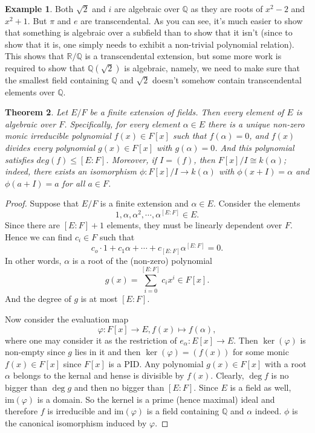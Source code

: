 \documentclass[12pt]{report}
\newtheorem{thm}{Theorem}[section]
\theoremstyle{definition}
\newtheorem{example}[thm]{Example}
\def\QQ{\mathbb{Q}}
\def\RR{\mathbb{R}}
\def\im{\mbox{im}}
\def\aa{\alpha}
\begin{document}
\begin{example}
    Both $\sqrt{2}$ and $i$ are algebraic over $\QQ$ as they are roots of $x^2-2$ and $x^2+1$.  But $\pi$ and $e$ are transcendental. As you can see, it's much easier to show that something is algebraic over a subfield than to show that it isn't (since to show that it is, one simply needs to exhibit a non-trivial
    polynomial relation). This shows that $\RR/\QQ$ is a transcendental extension, but some more work is required to show that $\QQ(\sqrt{2})$ is algebraic, namely, we need to make sure that the smallest
    field containing $\QQ$ and $\sqrt{2}$ doesn't somehow contain transcendental elements over $\QQ$.
\end{example}


\begin{thm}\label{minimal}
    Let $E/F$ be a finite extension of fields. Then every element of $E$ is algebraic over $F$. Specifically, for every element $\aa\in E$ there is a unique non-zero monic irreducible polynomial $f(x) \in F[x]$ such that $f(\aa) = 0$, and $f(x)$ divides every polynomial $g(x) \in F[x]$ with $g(\aa) = 0$. And this polynomial satisfies $deg(f) \leq [E:F]$. Moreover, if $I=(f)$, then $F[x]/I \cong k(\aa)$; indeed, there exists an isomorphism $\phi: F[x]/I \to k(\aa)$ with $\phi(x+I)=\alpha$ and $\phi(a+I)=a$ for all $a\in F$.
\end{thm}

\begin{proof}
    Suppose that $E/F$ is a finite extension and $\aa\in E$. Consider the elements $$1,\aa,\aa^2,\cdots,\aa^{[E:F]}\in E.$$
    Since there are $[E:F]+1$ elements, they must be linearly dependent over $F$. Hence we can find $c_i\in F$ such that $$c_o\cdot 1+c_1\aa+\cdots+c_{[E:F]}\aa^{[E:F]} =0.$$  In other words, $\aa$ is a root of the (non-zero) polynomial $$g(x)=\sum_{i=0}^{[E:F]}c_i x^i \in F[x].$$ And the degree of $g$ is at most $[E:F]$.

    Now consider the evaluation map $$\varphi: F[x]\to E, f(x)\mapsto f(\aa),$$ where one may consider it as the restriction of $e_\aa: E[x]\to E$. Then $\ker(\varphi)$ is non-empty since $g$ lies in it and then $\ker(\varphi)=(f(x))$ for some monic $f(x)\in F[x]$ since $F[x]$ is a PID. Any polynomial $g(x)\in F[x]$ with a root $\aa$ belongs to the kernal and hense is divisible by $f(x)$. Clearly, $\deg f$ is no bigger than $\deg g$ and then no bigger than $[E:F]$. Since $E$ is a field as well, $\im(\varphi)$ is a domain. So the kernel is a prime (hence maximal) ideal and therefore $f$ is irreducible and $\im(\varphi)$ is a field containing $\QQ$ and $\aa$ indeed. $\phi$ is the canonical isomorphism  induced by $\varphi$. 
\end{proof}
\end{document}
